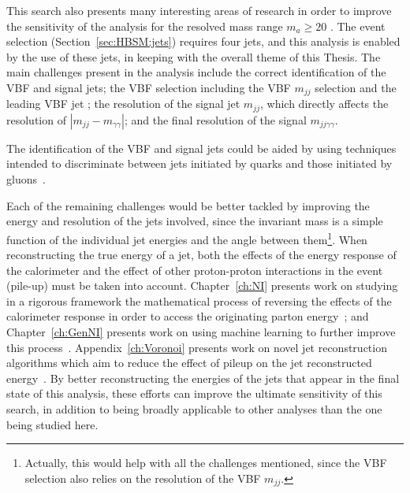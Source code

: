 This search also presents many interesting areas of research in order to improve the sensitivity of the analysis for the resolved mass range $m_a\ge 20$ \GeV{}.
The event selection (Section~\ref{sec:HBSM:jets}) requires four jets, and this analysis is enabled by the use of these jets, in keeping with the overall theme of this Thesis.
The main challenges present in the analysis include the correct identification of the VBF and signal jets; the VBF selection including the VBF $m_{jj}$ selection and the leading VBF jet \pt{}; the resolution of the signal jet $m_{jj}$, which directly affects the resolution of $|m_{jj}-m_{\gamma\gamma}|$; and the final resolution of the signal $m_{jj\gamma\gamma}$.

The identification of the VBF and signal jets could be aided by using techniques intended to discriminate between jets initiated by quarks and those initiated by gluons~\cite{ATL-PHYS-PUB-2017-009,Aad:2014gea,ATLAS-CONF-2016-034,ATL-PHYS-PUB-2017-017}.

Each of the remaining challenges would be better tackled by improving the energy and \pt{} resolution of the jets involved, since the invariant mass is a simple function of the individual jet energies and the angle between them\footnote{Actually, this would help with all the challenges mentioned, since the VBF selection also relies on the resolution of the VBF $m_{jj}$.}.
When reconstructing the true energy of a jet, both the effects of the energy response of the calorimeter and the effect of other proton-proton interactions in the event (pile-up) must be taken into account.
Chapter~\ref{ch:NI} presents work on studying in a rigorous framework the mathematical process of reversing the effects of the calorimeter response in order to access the originating parton energy~\cite{Cukierman:2016dkb};
and Chapter~\ref{ch:GenNI} presents work on using machine learning to further improve this process~\cite{ATL-PHYS-PUB-2018-013}.
Appendix~\ref{ch:Voronoi} presents work on novel jet reconstruction algorithms which aim to reduce the effect of pileup on the jet reconstructed energy~\cite{ATLAS-CONF-2017-065}.
By better reconstructing the energies of the jets that appear in the final state of this analysis, these efforts can improve the ultimate sensitivity of this search, in addition to being broadly applicable to other analyses than the one being studied here. 
